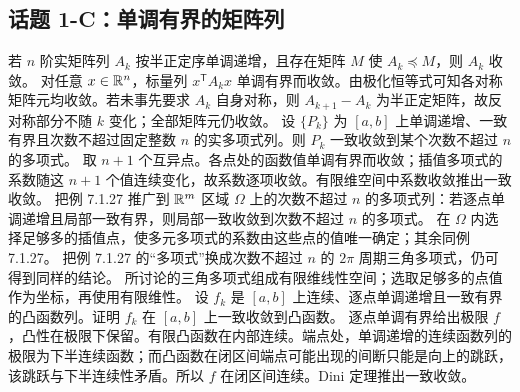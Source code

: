 \subsection*{话题 1-C：单调有界的矩阵列}
若 $n$ 阶实矩阵列 $A_k$ 按半正定序单调递增，且存在矩阵 $M$ 使 $A_k\preceq M$，则 $A_k$ 收敛。
\pf 对任意 $x\in\mathbb R^n$，标量列 $x^\mathsf TA_kx$ 单调有界而收敛。由极化恒等式可知各对称矩阵元均收敛。若未事先要求 $A_k$ 自身对称，则 $A_{k+1}-A_k$ 为半正定矩阵，故反对称部分不随 $k$ 变化；全部矩阵元仍收敛。
设 $\{P_k\}$ 为 $[a,b]$ 上单调递增、一致有界且次数不超过固定整数 $n$ 的实多项式列。则 $P_k$ 一致收敛到某个次数不超过 $n$ 的多项式。
\pf 取 $n+1$ 个互异点。各点处的函数值单调有界而收敛；插值多项式的系数随这 $n+1$ 个值连续变化，故系数逐项收敛。有限维空间中系数收敛推出一致收敛。
把例 7.1.27 推广到 $\mathbb R^m$ 区域 $\Omega$ 上的次数不超过 $n$ 的多项式列：若逐点单调递增且局部一致有界，则局部一致收敛到次数不超过 $n$ 的多项式。
\pf 在 $\Omega$ 内选择足够多的插值点，使多元多项式的系数由这些点的值唯一确定；其余同例 7.1.27。
把例 7.1.27 的“多项式”换成次数不超过 $n$ 的 $2\pi$ 周期三角多项式，仍可得到同样的结论。
\pf 所讨论的三角多项式组成有限维线性空间；选取足够多的点值作为坐标，再使用有限维性。
设 $f_k$ 是 $[a,b]$ 上连续、逐点单调递增且一致有界的凸函数列。证明 $f_k$ 在 $[a,b]$ 上一致收敛到凸函数。
\pf 逐点单调有界给出极限 $f$，凸性在极限下保留。有限凸函数在内部连续。端点处，单调递增的连续函数列的极限为下半连续函数；而凸函数在闭区间端点可能出现的间断只能是向上的跳跃，该跳跃与下半连续性矛盾。所以 $f$ 在闭区间连续。Dini 定理推出一致收敛。
